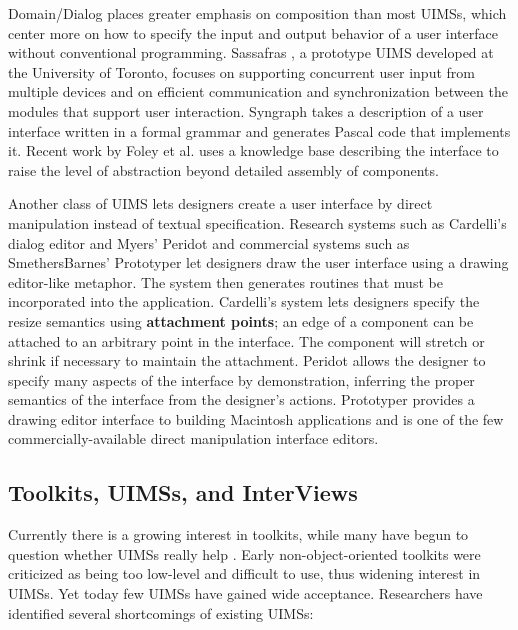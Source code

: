 Domain/Dialog places greater emphasis on composition than most UIMSs,
which center more on how to specify the input and output behavior of
a user interface without conventional programming.  Sassafras
\cite{sassafras}, a
prototype UIMS developed at the University of Toronto,
focuses on supporting concurrent
user input from multiple devices and on efficient communication and
synchronization between the modules that support user interaction.
Syngraph \cite{syngraph} takes a description of a user interface
written in a formal grammar and generates Pascal code that implements
it.  Recent work by Foley et al. \cite{foley:aiuims} uses a knowledge
base describing the interface to raise the level of abstraction
beyond detailed assembly of components.

Another class of UIMS lets designers create a user interface by direct
manipulation instead of textual specification.  Research systems such
as Cardelli's dialog editor \cite{src:uiEditor} and Myers' Peridot
\cite{peridot} and commercial systems such as SmethersBarnes'
Prototyper \cite{prototyper} let designers draw the user
interface using a drawing editor-like metaphor.  The system then
generates routines that must be incorporated into the application.
Cardelli's system lets designers specify the resize semantics using
{\bf attachment points}; an edge of a component can be attached to an
arbitrary point in the interface.  The component will stretch or
shrink if necessary to maintain the attachment.  Peridot allows the
designer to specify many aspects of the interface by demonstration,
inferring the proper semantics of the interface from the designer's
actions.  Prototyper provides a drawing editor
interface to building Macintosh applications and is one of the few
commercially-available direct manipulation interface editors.

\subsection*{Toolkits, UIMSs, and InterViews}

Currently there is a growing interest in toolkits, while
many have begun to question whether UIMSs really help
\cite{uims:bad}.  Early non-object-oriented toolkits
\cite{mac:toolbox,suntools} were criticized as being too low-level and
difficult to use, thus widening interest in UIMSs.  Yet today few
UIMSs have gained wide acceptance.  Researchers
\cite{myers:uiSurvey} have identified several shortcomings of existing
UIMSs:

